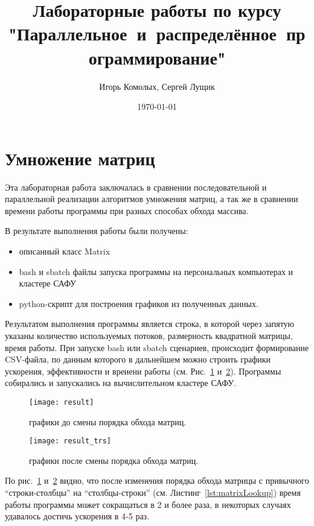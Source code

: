 \documentclass{article}
\author{Игорь Комолых, Сергей Лущик}
\title{Лабораторные работы по курсу "Параллельное~и~распределённое~программирование"}
\date{\today}
\begin{document}
	\begin{titlepage}
		\maketitle
	\end{titlepage}
	
	\section{Умножение матриц}\label{sec:lab1}

	Эта лабораторная работа заключалась в сравнении последовательной и параллельной реализации алгоритмов умножения матриц,
	а так же в сравнении времени работы программы при разных способах обхода массива.

	В результате выполнения работы были получены:
	\begin{itemize}
		\item описанный класс Matrix
		\item bash и sbatch файлы запуска программы на персональных компьютерах и кластере САФУ
		\item python-скрипт для построения графиков из полученных данных.
 	\end{itemize}

	Результатом выполнения программы является строка, в которой через запятую указаны количество используемых потоков, размерность квадратной матрицы, время работы. При запуске bash или sbatch сценариев, происходит формирование CSV-файла, по данным которого в дальнейшем можно строить графики ускорения, эффективности и вреиени работы (см. Рис.~\ref{fig:beforeChange} и~\ref{fig:afterChange}). Программы собирались и запускались на вычислительном кластере САФУ.

	\begin{figure}[h]
		\centering
		\texttt{[image: result]}
		\caption{графики до смены порядка обхода матриц.}
		\label{fig:beforeChange} 
	\end{figure}

	\begin{figure}[h]
		\centering
		\texttt{[image: result\_trs]}
		\caption{графики после смены порядка обхода матриц.}
		\label{fig:afterChange} 
	\end{figure}

	По рис.~\ref{fig:beforeChange} и~\ref{fig:afterChange} видно, что после изменения порядка обхода матрицы с привычного ``строки-столбцы'' на ``столбцы-строки'' (см. Листинг~\ref{lst:matrixLookup}) время работы программы может сокращаться в 2 и более раза, в некоторых случаях удавалось достичь ускорения в 4-5 раз.
\end{document}
